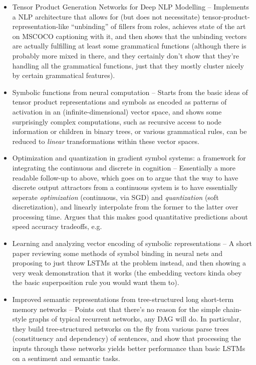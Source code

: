 \documentclass[11pt]{article}
\begin{document}
\begin{itemize}
\item Tensor Product Generation Networks for Deep NLP Modelling -- Implements a NLP architecture that allows for (but does not necessitate) tensor-product-representation-like ``unbinding'' of fillers from roles, achieves state of the art on MSCOCO captioning with it, and then shows that the unbinding vectors are actually fulfilling at least some grammatical functions (although there is probably more mixed in there, and they certainly don't show that they're handling all the grammatical functions, just that they mostly cluster nicely by certain grammatical features).
\item Symbolic functions from neural computation -- Starts from the basic ideas of tensor product representations and symbols as encoded as patterns of activation in an (infinite-dimensional) vector space, and shows some surprisingly complex computations, such as recursive access to node information or children in binary trees, or various grammatical rules, can be reduced to \emph{linear} transformations within these vector spaces.  
\item Optimization and quantization in gradient symbol systems: a framework for integrating the continuous and discrete in cognition -- Essentially a more readable follow-up to \citep{Smolensky2006} above, which goes on to argue that the way to have discrete output attractors from a continuous system is to have essentially seperate \emph{optimization} (continuous, via SGD) and \emph{quantization} (soft discretization), and linearly interpolate from the former to the latter over processing time. Argues that this makes good quantitative predictions about speed accuracy tradeoffs, e.g. \citep{Smolensky2014}
\item Learning and analyzing vector encoding of symbolic representations -- A short paper reviewing some methods of symbol binding in neural nets and proposing to just throw LSTMs at the problem instead, and then showing a very weak demonstration that it works (the embedding vectors kinda obey the basic superposition rule you would want them to). \citep{Fernandez2018} 
\item Improved semantic representations from tree-structured long short-term memory networks -- Points out that there's no reason for the simple chain-style graphs of typical recurrent networks, any DAG will do. In particular, they build tree-structured networks on the fly from various parse trees (constituency and dependency) of sentences, and show that processing the inputs through these networks yields better performance than basic LSTMs on a sentiment and semantic tasks. \citep{Tai2015} 

\end{itemize}
\end{document}
